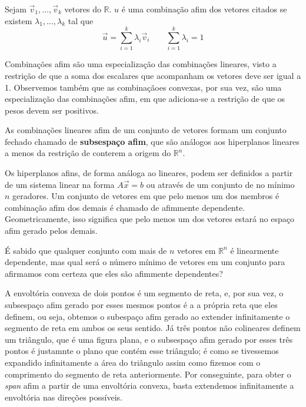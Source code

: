 \begin{def:combinação afim}
Sejam $\vec v_1, \ldots, \vec v_k$ vetores do $\mathbb{R}$. $u$ é uma
combinação afim dos vetores citados  se existem $\lambda_1, \ldots,
\lambda_k$ tal que
\begin{equation*}
	\vec u = \sum_{i =1}^{k}\lambda_i \vec v_i \quad \quad \sum_{i=1}^{k} \lambda_i = 1
\end{equation*}
\end{def:combinação afim}
Combinações afim são uma especialização das combinações
lineares, visto a restrição de que a soma dos escalares
que acompanham os vetores deve ser igual a 1. Observemos
também que as combinaçãoes convexas, por sua vez, são uma
especialização das combinações afim, em que adiciona-se a
restrição de que os pesos devem ser positivos.

As combinações lineares afim de um conjunto de vetores
formam um conjunto fechado chamado de \textbf{subsespaço afim},
que são análogos aos hiperplanos lineares a menos
da restrição de conterem a
origem do $\mathbb{R}^n$.


Os hiperplanos  afins, de forma análoga ao lineares, podem ser
definidos a partir de um sistema linear na forma $A\vec x = b$
ou através de um conjunto de no mínimo $n$ geradores.
Um conjunto de vetores em que pelo menos um dos membros
é combinação afim dos demais é chamado de afimmente dependente.
Geometricamente, isso significa que pelo menos um dos vetores estará
no espaço afim gerado pelos demais.

É sabido que qualquer conjunto com mais de $n$ vetores em
$\mathbb{R}^n$ é linearmente dependente, mas qual será o número mínimo
de vetores em um conjunto para afirmamos com certeza que eles são
afimmente dependentes?

A envoltória convexa de dois pontos é um segmento de reta, e,
por sua vez, o subsespaço afim gerado por esses mesmos pontos é a
a própria reta que eles definem, ou seja, obtemos o subespaço
afim gerado ao extender infinitamente o segmento de reta em
ambos os seus sentido. Já três pontos não colineares
definem um triângulo, que é uma figura plana, e o subsespaço afim gerado por
esses três pontos é justamnte o plano que contém esse triângulo; é como se
tivessemos expandido infinitamente a área do triângulo assim como fizemos
com o comprimento do segmento de reta anteriormente. Por conseguinte,
para obter o \textit{span} afim a partir de uma envoltória convexa, basta
extendemos infinitamente a envoltória nas direções possíveis.

